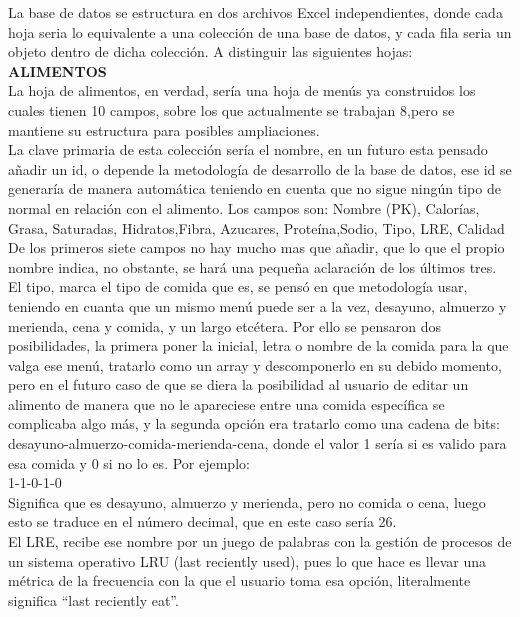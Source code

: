 La base de datos se estructura en dos archivos Excel independientes, donde cada hoja seria lo equivalente a una colección de una base de datos, y cada fila seria un objeto dentro de dicha colección. A distinguir las siguientes hojas:\\

\textbf{\textsc{ALIMENTOS}}\\
La hoja de alimentos, en verdad, sería una hoja de menús ya construidos los cuales tienen 10 campos, sobre los que actualmente se trabajan 8,pero se mantiene su estructura para posibles ampliaciones.\\

La clave primaria de esta colección sería el nombre, en un futuro esta pensado añadir un id, o depende la metodología de desarrollo de la base de datos, ese id se generaría de manera automática teniendo en cuenta que no sigue ningún tipo de normal en relación con el alimento.
Los campos son:
Nombre (PK), Calorías, Grasa, Saturadas, Hidratos,Fibra, Azucares, Proteína,Sodio, Tipo, LRE, Calidad
De los primeros siete campos no hay mucho mas que añadir, que lo que el propio nombre indica, no obstante, se hará una pequeña aclaración de los últimos tres.\\

El tipo, marca el tipo de comida que es, se pensó en que metodología usar, teniendo en cuanta que un mismo menú puede ser a la vez, desayuno, almuerzo y merienda, cena y comida, y un largo etcétera. Por ello se pensaron dos posibilidades, la primera poner la inicial, letra o nombre de la comida para la que valga ese menú, tratarlo como un array y descomponerlo en su debido momento, pero en el futuro caso de que se diera la posibilidad al usuario de editar un alimento de manera que no le apareciese entre una comida específica se complicaba algo más, y la segunda opción era tratarlo como una cadena de bits: desayuno-almuerzo-comida-merienda-cena, donde el valor 1 sería si es valido para esa comida y 0 si no lo es. Por ejemplo:\\
1-1-0-1-0 \\

Significa que es desayuno, almuerzo y merienda, pero no comida o cena, luego esto se traduce en el número decimal, que en este caso sería 26.\\

El LRE, recibe ese nombre por un juego de palabras con la gestión de procesos de un sistema operativo LRU (last reciently used), pues lo que hace es llevar una métrica de la frecuencia con la que el usuario toma esa opción, literalmente significa “last reciently eat”. \\

